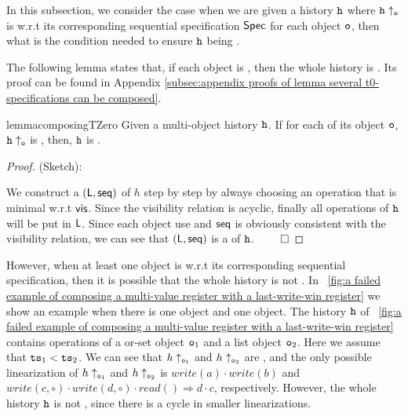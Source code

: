 In this subsection, we consider the case when we are given a history $\mathtt{h}$ where $\mathtt{h} \uparrow_{\mathtt{o}}$ is \crdtlinearizable{} w.r.t its corresponding sequential specification $\mathsf{Spec}{}$ for each object $\mathtt{o}$, then what is the condition needed to ensure $\mathtt{h}$ being \crdtlinearizable.

The following lemma states that, if each object is \tzerolinearizable{}, then the whole history is \crdtlinearizable{}. Its proof can be found in Appendix \ref{subsec:appendix proofs of lemma several t0-specifications can be composed}.

\begin{restatable}{lemma}{composingTZero}
\label{lemma:several t0-specifications can be composed}
Given a multi-object history $\mathtt{h}$. If for each of its object $\mathtt{o}$, $\mathtt{h} \uparrow_{\mathtt{o}}$ is \tzerolinearizable{}, then, $\mathtt{h}$ is \crdtlinearizable{}.
\end{restatable}

\begin {proof} (Sketch):

We construct a \crdtlinearization $(\mathsf{L}, \mathsf{seq})$ of $h$ step by step by always choosing an operation that is minimal w.r.t $\mathsf{vis}$. Since the visibility relation is acyclic, finally all operations of $\mathtt{h}$ will be put in $\mathsf{L}$. Since each object use \tzerolin{} and $\mathsf{seq}$ is obviously consistent with the visibility relation, we can see that $(\mathsf{L}, \mathsf{seq})$ is a \crdtlinearization of $\mathtt{h}$. $\qed$
\end {proof}


However, %
when at least one object is \tonelinearizable{} w.r.t its corresponding sequential specification, then it is possible that the whole history is not \crdtlinearizable. In \figurename~\ref{fig:a failed example of composing a multi-value register with a last-write-win register} we show an example when there is one \tonelinearizable{} object and one \tzerolinearizable{} object. The history $\mathtt{h}$ of \figurename~\ref{fig:a failed example of composing a multi-value register with a last-write-win register} contains operations of a or-set object $\mathtt{o}_1$ and a list object $\mathtt{o}_2$. Here we assume that $\mathtt{ts}_1 < \mathtt{ts}_2$. We can see that $h \uparrow_{\mathtt{o}_1}$ and $h \uparrow_{\mathtt{o}_2}$ are \crdtlinearizable, and the only possible linearization of $h \uparrow_{\mathtt{o}_1}$ and $h \uparrow_{\mathtt{o}_2}$ is $\mathit{write}(a) \cdot \mathit{write}(b)$ and $\mathit{write}(c,\circ) \cdot \mathit{write}(d,\circ) \cdot \mathit{read}() \Rightarrow d \cdot c$, respectively. However, the whole history $\mathtt{h}$ is not \crdtlinearizable, since there is a cycle in smaller linearizations.

